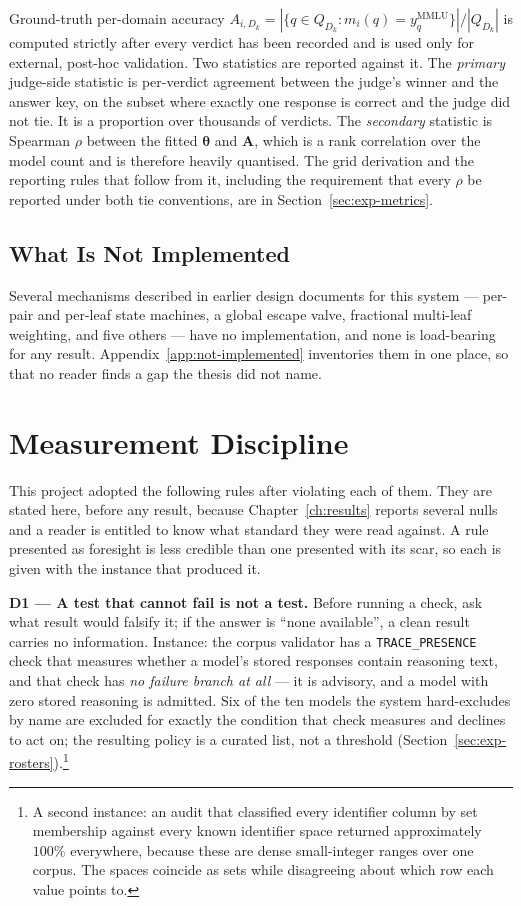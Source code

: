Ground-truth per-domain accuracy
$A_{i,D_k} = |\{q \in Q_{D_k} : m_i(q) = y_q^{\text{MMLU}}\}| /
|Q_{D_k}|$
is computed strictly after every verdict has been recorded and is used
only for external, post-hoc validation.
Two statistics are reported against it.
The \emph{primary} judge-side statistic is per-verdict agreement
between the judge's winner and the answer key, on the subset where
exactly one response is correct and the judge did not tie. It is a
proportion over thousands of verdicts.
The \emph{secondary} statistic is Spearman $\rho$ between the fitted
$\boldsymbol{\theta}$ and $\mathbf{A}$, which is a rank correlation
over the model count and is therefore heavily quantised. The grid
derivation and the reporting rules that follow from it, including the
requirement that every $\rho$ be reported under both tie conventions,
are in Section~\ref{sec:exp-metrics}.

\subsection{What Is Not Implemented}\label{sec:meth-not-implemented}

Several mechanisms described in earlier design documents for this
system --- per-pair and per-leaf state machines, a global escape
valve, fractional multi-leaf weighting, and five others --- have no
implementation, and none is load-bearing for any result.
Appendix~\ref{app:not-implemented} inventories them in one place, so
that no reader finds a gap the thesis did not name.

\section{Measurement Discipline}\label{sec:meth-discipline}

This project adopted the following rules after violating each of them.
They are stated here, before any result, because Chapter~\ref{ch:results}
reports several nulls and a reader is entitled to know what standard
they were read against. A rule presented as foresight is less credible
than one presented with its scar, so each is given with the instance
that produced it.

\textbf{D1 --- A test that cannot fail is not a test.}
Before running a check, ask what result would falsify it; if the answer
is ``none available'', a clean result carries no information.
Instance: the corpus validator has a \texttt{TRACE\_PRESENCE} check
that measures whether a model's stored responses contain reasoning
text, and that check has \emph{no failure branch at all} --- it is
advisory, and a model with zero stored reasoning is admitted. Six of
the ten models the system hard-excludes by name are excluded for
exactly the condition that check measures and declines to act on; the
resulting policy is a curated list, not a threshold
(Section~\ref{sec:exp-rosters}).\footnote{A second instance: an audit that
classified every identifier column by set membership against every
known identifier space returned approximately $100\%$ everywhere,
because these are dense small-integer ranges over one corpus. The
spaces coincide as sets while disagreeing about which row each value
points to.}

